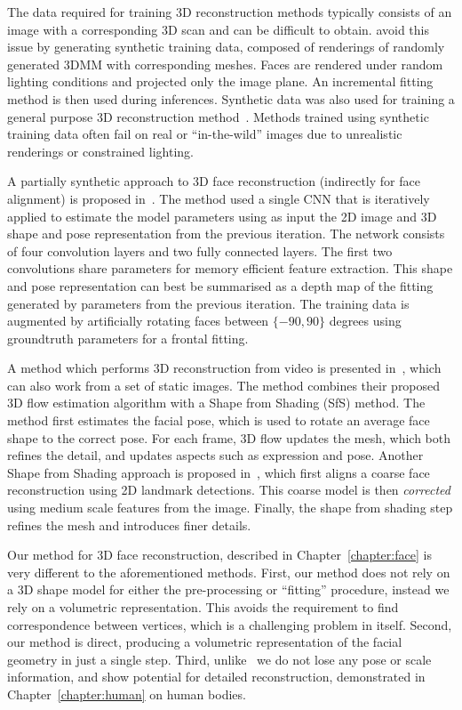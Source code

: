 The data required for training 3D reconstruction methods typically
consists of an image with a corresponding 3D scan and can be difficult
to obtain. \cite{richardson20163d} avoid this issue by generating
synthetic training data, composed of renderings of randomly generated
3DMM with corresponding meshes. Faces are rendered under random
lighting conditions and projected only the image plane. An incremental
fitting method is then used during inferences. Synthetic data was also
used for training a general purpose 3D reconstruction
method~\cite{li2015joint}. Methods trained using synthetic training
data often fail on real or ``in-the-wild'' images due to unrealistic
renderings or constrained lighting.

A partially synthetic approach to 3D face reconstruction (indirectly
for face alignment) is proposed in~\cite{zhu2016face}. The method used
a single CNN that is iteratively applied to estimate the model
parameters using as input the 2D image and 3D shape and pose
representation from the previous iteration. The network consists of
four convolution layers and two fully connected layers. The first two
convolutions share parameters for memory efficient feature
extraction. This shape and pose representation can best be summarised
as a depth map of the fitting generated by parameters from the
previous iteration. The training data is augmented by artificially
rotating faces between $\{-90, 90\}$ degrees using groundtruth
parameters for a frontal fitting.

A method which performs 3D reconstruction from video is presented
in~\cite{suwajanakorn2014total}, which can also work from a set of
static images. The method combines their proposed 3D flow estimation
algorithm with a Shape from Shading (SfS) method. The method first
estimates the facial pose, which is used to rotate an average face
shape to the correct pose. For each frame, 3D flow updates the mesh,
which both refines the detail, and updates aspects such as expression
and pose. Another Shape from Shading approach is proposed
in~\cite{jiang20183d}, which first aligns a coarse face reconstruction
using 2D landmark detections. This coarse model is then
\textit{corrected} using medium scale features from the
image. Finally, the shape from shading step refines the mesh and
introduces finer details.

Our method for 3D face reconstruction, described in
Chapter~\ref{chapter:face} is very different to the aforementioned
methods. First, our method does not rely on a 3D shape model for
either the pre-processing or ``fitting'' procedure, instead we rely on
a volumetric representation. This avoids the requirement to find
correspondence between vertices, which is a challenging problem in
itself. Second, our method is direct, producing a volumetric
representation of the facial geometry in just a single step. Third,
unlike~\cite{tran2018extreme} we do not lose any pose or scale
information, and show potential for detailed reconstruction,
demonstrated in Chapter~\ref{chapter:human} on human bodies.



